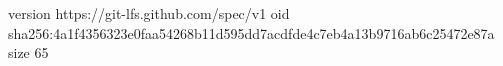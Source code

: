 version https://git-lfs.github.com/spec/v1
oid sha256:4a1f4356323e0faa54268b11d595dd7acdfde4c7eb4a13b9716ab6c25472e87a
size 65
